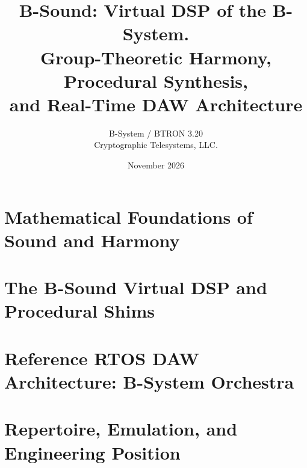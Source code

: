 \documentclass[11pt,a4paper]{memoir}
\title{B-Sound: Virtual DSP of the B-System.\\[0.3em]
\Large Group-Theoretic Harmony, Procedural Synthesis,\\
and Real-Time DAW Architecture}
\author{B-System / BTRON 3.20\\Cryptographic Telesystems, LLC.}
\date{November 2026}
\theoremstyle{definition}
\theoremstyle{plain}
\theoremstyle{remark}
\begin{document}
\frontmatter
\maketitle
\tableofcontents




\mainmatter
\part{Mathematical Foundations of Sound and Harmony}




\part{The B-Sound Virtual DSP and Procedural Shims}



\part{Reference RTOS DAW Architecture: B-System Orchestra}






\part{Repertoire, Emulation, and Engineering Position}



\appendix


\backmatter




\end{document}
